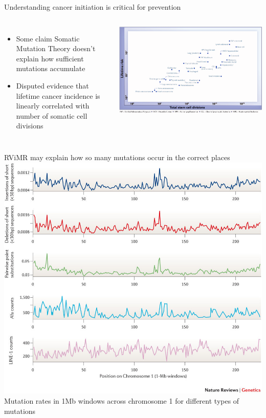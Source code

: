 \documentclass{beamer}
\begin{document}
\begin{frame}{Understanding cancer initiation is critical for prevention}
\begin{columns}
\begin{itemize}
\item Some claim Somatic Mutation Theory doesn't explain how sufficient mutations accumulate \parencite{baker_cancer_2015}
\item Disputed evidence that lifetime cancer incidence is linearly correlated with number of somatic cell divisions \parencite{tomasetti_variation_2015}
\end{itemize}
\includegraphics[width=\linewidth]{tomasetti_2015_risk.png}
\end{columns}
\end{frame}

\begin{frame}{RViMR may explain how so many mutations occur in the correct places}
\includegraphics[width=\linewidth,trim={0 13cm 0 0},clip]{makova_2015_rvimr.jpg}
Mutation rates in 1Mb windows across chromosome 1 for different types of mutations \parencite{makova_effects_2015}
\end{frame}
\end{document}
